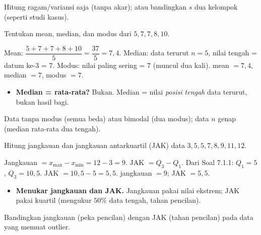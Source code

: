 \begin{variasi}
Hitung ragam/variansi saja (tanpa akar); atau bandingkan $s$ dua kelompok
(seperti studi kasus).
\end{variasi}

\begin{soalbox}{}
Tentukan mean, median, dan modus dari $5,7,7,8,10$.
\end{soalbox}

\jawab
{} Mean: $\dfrac{5+7+7+8+10}{5}=\dfrac{37}{5}=7{,}4$.
 Median: data terurut $n=5$, nilai tengah = datum ke-3 = $7$.
 Modus: nilai paling sering = $7$ (muncul dua kali).
\jadi mean $=7{,}4$, median $=7$, modus $=7$.

\begin{jebakan}
\begin{itemize}[leftmargin=*,topsep=2pt]
  \item \textbf{Median = rata-rata?} Bukan. Median = nilai \emph{posisi tengah}
  data terurut, bukan hasil bagi.
\end{itemize}
\end{jebakan}

\begin{variasi}
Data tanpa modus (semua beda) atau bimodal (dua modus); data $n$ genap (median
rata-rata dua tengah).
\end{variasi}

\begin{soalbox}{}
Hitung jangkauan dan jangkauan antarkuartil (JAK) data $3,5,5,7,8,9,11,12$.
\end{soalbox}

\jawab
{} Jangkauan $=x_{\max}-x_{\min}=12-3=9$.
 JAK $=Q_3-Q_1$. Dari Soal 7.1.1: $Q_1=5$, $Q_3=10{,}5$.
 JAK $=10{,}5-5=5{,}5$.
\jadi jangkauan $=9$; JAK $=5{,}5$.

\begin{jebakan}
\begin{itemize}[leftmargin=*,topsep=2pt]
  \item \textbf{Menukar jangkauan dan JAK.} Jangkauan pakai nilai ekstrem; JAK
  pakai kuartil (mengukur $50\%$ data tengah, tahan pencilan).
\end{itemize}
\end{jebakan}

\begin{variasi}
Bandingkan jangkauan (peka pencilan) dengan JAK (tahan pencilan) pada data yang
memuat outlier.
\end{variasi}


